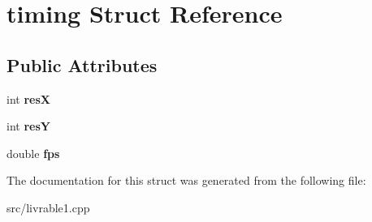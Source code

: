 \hypertarget{structtiming}{\section{timing Struct Reference}
\label{structtiming}
}
\subsection*{Public Attributes}
\begin{DoxyCompactItemize}
\item 
\hypertarget{structtiming_a3d4e62541518d2d7090bb7c986fb798f}{int {\bfseries res\-X}}\label{structtiming_a3d4e62541518d2d7090bb7c986fb798f}

\item 
\hypertarget{structtiming_af0dad6c92b1ce60b5f1421fb0928f28a}{int {\bfseries res\-Y}}\label{structtiming_af0dad6c92b1ce60b5f1421fb0928f28a}

\item 
\hypertarget{structtiming_a0db1b574e8a0c4f479fda997891349be}{double {\bfseries fps}}\label{structtiming_a0db1b574e8a0c4f479fda997891349be}

\end{DoxyCompactItemize}


The documentation for this struct was generated from the following file\-:\begin{DoxyCompactItemize}
\item 
src/livrable1.\-cpp\end{DoxyCompactItemize}

